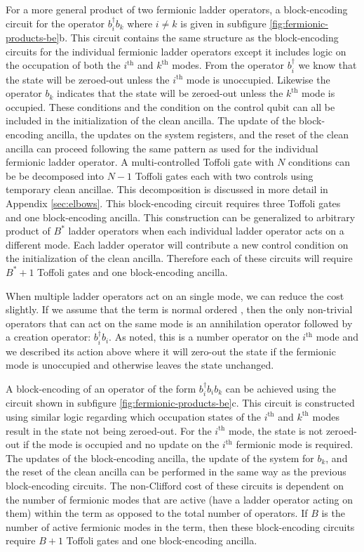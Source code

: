 For a more general product of two fermionic ladder operators, a block-encoding circuit for the operator $b_i^\dagger b_k$ where $i \neq k$ is given in subfigure \ref{fig:fermionic-products-be}b.
This circuit contains the same structure as the block-encoding circuits for the individual fermionic ladder operators except it includes logic on the occupation of both the $i^\text{th}$ and $k^\text{th}$ modes.
From the operator $b_i^\dagger$ we know that the state will be zeroed-out unless the $i^\text{th}$ mode is unoccupied.
Likewise the operator $b_k$ indicates that the state will be zeroed-out unless the $k^\text{th}$ mode is occupied.
These conditions and the condition on the control qubit can all be included in the initialization of the clean ancilla.
The update of the block-encoding ancilla, the updates on the system registers, and the reset of the clean ancilla can proceed following the same pattern as used for the individual fermionic ladder operator.
A multi-controlled Toffoli gate with $N$ conditions can be be decomposed into $N-1$ Toffoli gates each with two controls using temporary clean ancillae.
This decomposition is discussed in more detail in Appendix \ref{sec:elbows}.
This block-encoding circuit requires three Toffoli gates and one block-encoding ancilla.
This construction can be generalized to arbitrary product of $B^*$ ladder operators when each individual ladder operator acts on a different mode.
Each ladder operator will contribute a new control condition on the initialization of the clean ancilla.
Therefore each of these circuits will require $B^* + 1$ Toffoli gates and one block-encoding ancilla.

When multiple ladder operators act on an single mode, we can reduce the cost slightly.
If we assume that the term is normal ordered , then the only non-trivial operators that can act on the same mode is an annihilation operator followed by a creation operator: $b_i^\dagger b_i$.
As noted, this is a number operator on the $i^\text{th}$ mode and we described its action above where it will zero-out the state if the fermionic mode is unoccupied and otherwise leaves the state unchanged.

A block-encoding of an operator of the form $b_i^\dagger b_i b_k$ can be achieved using the circuit shown in subfigure \ref{fig:fermionic-products-be}c.
This circuit is constructed using similar logic regarding which occupation states of the $i^\text{th}$ and $k^\text{th}$ modes result in the state not being zeroed-out.
For the $i^\text{th}$ mode, the state is not zeroed-out if the mode is occupied and no update on the $i^\text{th}$ fermionic mode is required. 
The updates of the block-encoding ancilla, the update of the system for $b_k$, and the reset of the clean ancilla can be performed in the same way as the previous block-encoding circuits.
The non-Clifford cost of these circuits is dependent on the number of fermionic modes that are active (have a ladder operator acting on them) within the term as opposed to the total number of operators.
If $B$ is the number of active fermionic modes in the term, then these block-encoding circuits require $B + 1$ Toffoli gates and one block-encoding ancilla. 


